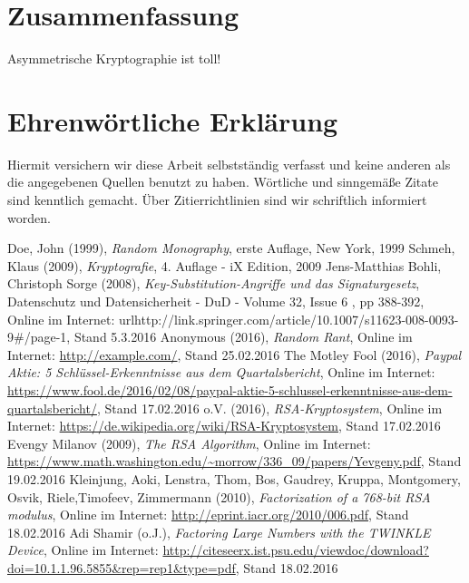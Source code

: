 \documentclass[a4paper, fontsize=12pt, parskip=full, toc=bibliographynumbered]{scrreprt}
\begin{document}
\author{}
\chapter{Zusammenfassung}

Asymmetrische Kryptographie ist toll!

\author{}
\chapter{Ehrenwörtliche Erklärung}

Hiermit versichern wir diese Arbeit selbstständig verfasst und keine
anderen als die angegebenen Quellen benutzt zu haben.  Wörtliche und
sinngemäße Zitate sind kenntlich gemacht.  Über Zitierrichtlinien
sind wir schriftlich informiert worden.

\renewcommand{\bibname}{Quellenverzeichnis}
\begin{thebibliography}{9}
 Doe, John (1999), \emph{Random Monography}, erste
  Auflage, New York, 1999
 Schmeh, Klaus (2009), \emph{Kryptografie}, 4. Auflage - iX Edition, 2009
 Jens-Matthias Bohli, Christoph Sorge (2008), \emph{Key-Substitution-Angriffe und das Signaturgesetz}, Datenschutz und Datensicherheit - DuD - Volume 32, Issue 6 , pp 388-392, Online im Internet: url{http://link.springer.com/article/10.1007/s11623-008-0093-9#/page-1}, Stand 5.3.2016
 Anonymous (2016), \emph{Random Rant}, Online im
  Internet: \url{http://example.com/}, Stand 25.02.2016
 The Motley Fool (2016), \emph{Paypal Aktie: 5 Schlüssel-Erkenntnisse aus dem Quartalsbericht}, Online im
  Internet: \url{https://www.fool.de/2016/02/08/paypal-aktie-5-schlussel-erkenntnisse-aus-dem-quartalsbericht/}, Stand 17.02.2016
 o.V. (2016), \emph{RSA-Kryptosystem}, Online im
  Internet: \url{https://de.wikipedia.org/wiki/RSA-Kryptosystem}, Stand 17.02.2016
 Evengy Milanov (2009), \emph{The RSA Algorithm}, Online im
  Internet: \url{https://www.math.washington.edu/~morrow/336_09/papers/Yevgeny.pdf}, Stand 19.02.2016
 Kleinjung, Aoki, Lenstra, Thom, Bos, Gaudrey, Kruppa, Montgomery, Osvik, Riele,Timofeev, Zimmermann (2010), \emph{Factorization of a 768-bit RSA modulus}, Online im
  Internet: \url{http://eprint.iacr.org/2010/006.pdf}, Stand 18.02.2016
 Adi Shamir (o.J.), \emph{Factoring Large Numbers with the TWINKLE Device}, Online im
  Internet: \url{http://citeseerx.ist.psu.edu/viewdoc/download?doi=10.1.1.96.5855&rep=rep1&type=pdf}, Stand 18.02.2016
\end{thebibliography}
\end{document}
